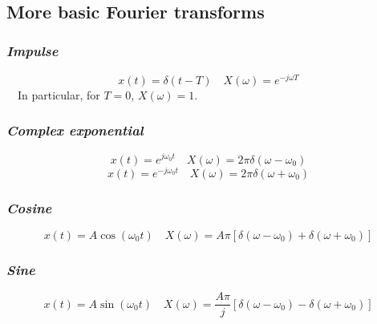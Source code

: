 \documentclass[12pt,a4paper]{article}
\begin{document}
 
\ \\
\subsection{More basic Fourier transforms}
\subsubsection{\textit{Impulse}}
\[ x(t)=\delta(t-T) \quad X(\omega)=e^{-j\omega T} \]
\ \ In particular, for $T=0$, $X(\omega)=1$.
\subsubsection{\textit{Complex exponential}}
\[ x(t)=e^{j\omega_{0}t} \quad X(\omega)=2\pi \delta(\omega-\omega_{0}) \]
\[ x(t)=e^{-j\omega_{0}t} \quad X(\omega)=2\pi \delta(\omega+\omega_{0}) \]
\subsubsection{\textit{Cosine}}
\[ x(t)=A\cos(\omega_{0} t)\quad X(\omega)=A\pi[ \delta(\omega-\omega_{0})+ \delta(\omega+\omega_{0})] \]
\subsubsection{\textit{Sine}}
\[ x(t)=A\sin(\omega_{0} t)\quad X(\omega)=\frac{A \pi}{j}[ \delta(\omega-\omega_{0})- \delta(\omega+\omega_{0})] \]
\ \\ \\
\end{document}
